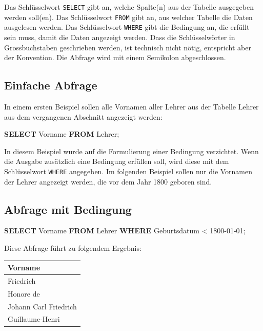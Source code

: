\documentclass[
  nswissgerman,
  a4paper,
  DIV=11,
  numbers=noendperiod,
  ngerman]{scrreprt}
\newenvironment{Shaded}{\begin{snugshade}}{\end{snugshade}}
\newcommand{\KeywordTok}[1]{\textcolor[rgb]{0.00,0.23,0.31}{\textbf{#1}}}
\newcommand{\NormalTok}[1]{\textcolor[rgb]{0.00,0.23,0.31}{#1}}
\newcommand{\OperatorTok}[1]{\textcolor[rgb]{0.37,0.37,0.37}{#1}}
\newcommand{\StringTok}[1]{\textcolor[rgb]{0.13,0.47,0.30}{#1}}
\newcounter{none} %
\begin{document}
Das Schlüsselwort \texttt{SELECT} gibt an, welche Spalte(n) aus der
Tabelle ausgegeben werden soll(en). Das Schlüsselwort \texttt{FROM} gibt
an, aus welcher Tabelle die Daten ausgelesen werden. Das Schlüsselwort
\texttt{WHERE} gibt die Bedingung an, die erfüllt sein muss, damit die
Daten angezeigt werden. Dass die Schlüsselwörter in Grossbuchstaben
geschrieben werden, ist technisch nicht nötig, entspricht aber der
Konvention. Die Abfrage wird mit einem Semikolon abgeschlossen.

\subsection{Einfache Abfrage}\label{einfache-abfrage}

In einem ersten Beispiel sollen alle Vornamen aller Lehrer aus der
Tabelle Lehrer aus dem vergangenen Abschnitt angezeigt werden:

\begin{Shaded}
\begin{Highlighting}[numbers=left,,]
\KeywordTok{SELECT}\NormalTok{ Vorname}
\KeywordTok{FROM}\NormalTok{ Lehrer;}
\end{Highlighting}
\end{Shaded}

In diesem Beispiel wurde auf die Formulierung einer Bedingung
verzichtet. Wenn die Ausgabe zusätzlich eine Bedingung erfüllen soll,
wird diese mit dem Schlüsselwort \texttt{WHERE} angegeben. Im folgenden
Beispiel sollen nur die Vornamen der Lehrer angezeigt werden, die vor
dem Jahr 1800 geboren sind.

\subsection{Abfrage mit Bedingung}\label{abfrage-mit-bedingung}

\begin{Shaded}
\begin{Highlighting}[numbers=left,,]
\KeywordTok{SELECT}\NormalTok{ Vorname}
\KeywordTok{FROM}\NormalTok{ Lehrer}
\KeywordTok{WHERE}\NormalTok{ Geburtsdatum }\OperatorTok{\textless{}} \StringTok{\textquotesingle{}1800{-}01{-}01\textquotesingle{}}\NormalTok{;}
\end{Highlighting}
\end{Shaded}

Diese Abfrage führt zu folgendem Ergebnis:

{\def\LTcaptype{none} %
\begin{longtable}[]{@{}l@{}}
\toprule\noalign{}
Vorname \\
\midrule\noalign{}
\endhead
\bottomrule\noalign{}
\endlastfoot
Friedrich \\
Honore de \\
Johann Carl Friedrich \\
Guillaume-Henri \\
\end{longtable}
}
\end{document}
